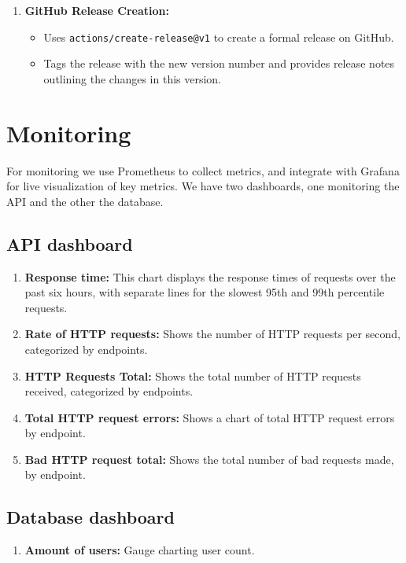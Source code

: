 \documentclass[12pt, a4paper, oneside]{book}
\begin{document}
\begin{spacing}{1.5}
\begin{enumerate}
    \item \textbf{GitHub Release Creation:}
    \begin{itemize}
        \item Uses \texttt{actions/create-release@v1} to create a formal release on GitHub.
        \item Tags the release with the new version number and provides release notes outlining the changes in this version.
    \end{itemize}
\end{enumerate}



\section{Monitoring}
For monitoring we use Prometheus to collect metrics, and integrate with Grafana for live visualization of key metrics. We have two dashboards, one monitoring the API and the other the database.

\subsection{API dashboard}
 \begin{enumerate}
    \item \textbf{Response time:}
    This chart displays the response times of requests over the past six hours, with separate lines for the slowest 95th and 99th percentile requests.

    \item \textbf{Rate of HTTP requests:}
    Shows the number of HTTP requests per second, categorized by endpoints.
    
    \item \textbf{HTTP Requests Total:}
    Shows the total number of HTTP requests received, categorized by endpoints.
    
    \item \textbf{Total HTTP request errors:}
    Shows a chart of total HTTP request errors by endpoint.
    
    \item \textbf{Bad HTTP request total:}
    Shows the total number of bad requests made, by endpoint.
\end{enumerate}

\subsection{Database dashboard}
 \begin{enumerate}
    \item \textbf{Amount of users:}
    Gauge charting user count.
    

\end{enumerate}
\end{spacing}
\end{document}
